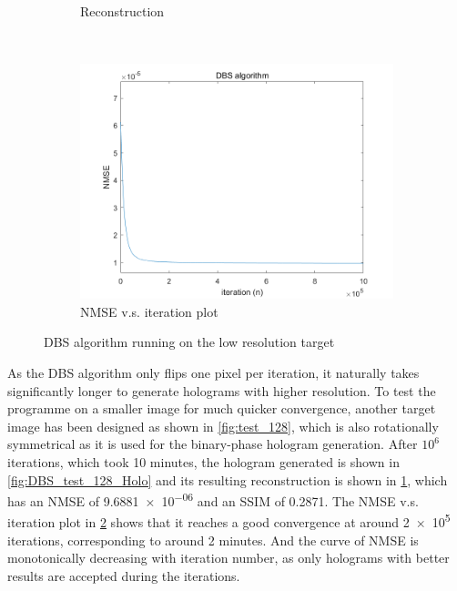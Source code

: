 \begin{figure}[H]
\begin{subfigure}[t]{0.3\textwidth}
    \caption{Reconstruction}
    \label{fig:DBS_test_128_recon_intensity}
  \end{subfigure}
  \\
  \begin{subfigure}[t]{0.7\textwidth}
    \centering
    \includegraphics[width=\textwidth]{DBS_test_128_convergence.png}
    \caption{NMSE v.s. iteration plot}
    \label{fig:DBS_test_128_convergence}
  \end{subfigure}
  \caption{DBS algorithm running on the low resolution target}
  \label{fig:DBS algorithm running on the low resolution target}
\end{figure}

As the DBS algorithm only flips one pixel per iteration, it naturally takes significantly longer to generate holograms with higher resolution. To test the programme on a smaller image for much quicker convergence, another target image has been designed as shown in \cref{fig:test_128}, which is also rotationally symmetrical as it is used for the binary-phase hologram generation. After $10^6$ iterations, which took 10 minutes, the hologram generated is shown in \cref{fig:DBS_test_128_Holo} and its resulting reconstruction is shown in \cref{fig:DBS_test_128_recon_intensity}, which has an NMSE of \num{9.6881e-06} and an SSIM of 0.2871. The NMSE v.s. iteration plot in \cref{fig:DBS_test_128_convergence} shows that it reaches a good convergence at around \num{2e5} iterations, corresponding to around 2 minutes. And the curve of NMSE is monotonically decreasing with iteration number, as only holograms with better results are accepted during the iterations.

